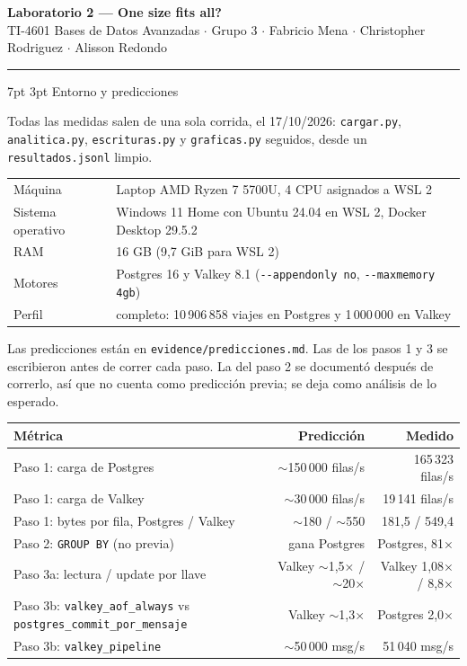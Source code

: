 \documentclass[10pt,letterpaper]{article}
\makeatletter
\renewcommand\section{\@startsection{section}{1}{\z@}%
  {7pt \@plus 2pt \@minus 1pt}{3pt}%
  {\normalfont\normalsize\bfseries\color{acc}}}
\makeatother
\begin{document}
{\LARGE\bfseries\color{acc} Laboratorio 2 --- One size fits all?}\\[2pt]
{\footnotesize\color{gris} TI-4601 Bases de Datos Avanzadas $\cdot$ Grupo 3 $\cdot$ Fabricio Mena $\cdot$ Christopher Rodriguez $\cdot$ Alisson Redondo}

\vspace{4pt}\hrule\vspace{6pt}

\section{Entorno y predicciones}

Todas las medidas salen de una sola corrida, el 17/10/2026: \texttt{cargar.py}, \texttt{analitica.py},
\texttt{escrituras.py} y \texttt{graficas.py} seguidos, desde un \texttt{resultados.jsonl} limpio.

\begin{center}\footnotesize
\begin{tabular}{@{}ll@{}}
\toprule
Máquina & Laptop AMD Ryzen 7 5700U, 4 CPU asignados a WSL 2 \\
Sistema operativo & Windows 11 Home con Ubuntu 24.04 en WSL 2, Docker Desktop 29.5.2 \\
RAM & 16 GB (9,7 GiB para WSL 2) \\
Motores & Postgres 16 y Valkey 8.1 (\texttt{-{}-appendonly no}, \texttt{-{}-maxmemory 4gb}) \\
Perfil & completo: 10\,906\,858 viajes en Postgres y 1\,000\,000 en Valkey \\
\bottomrule
\end{tabular}
\end{center}

Las predicciones están en \texttt{evidence/predicciones.md}. Las de los pasos 1 y 3 se escribieron antes
de correr cada paso. La del paso 2 se documentó después de correrlo, así que no cuenta como predicción
previa; se deja como análisis de lo esperado.

\begin{center}\footnotesize
\begin{tabular}{@{}lrr@{}}
\toprule
\textbf{Métrica} & \textbf{Predicción} & \textbf{Medido} \\
\midrule
Paso 1: carga de Postgres & $\sim$150\,000 filas/s & 165\,323 filas/s \\
Paso 1: carga de Valkey & $\sim$30\,000 filas/s & 19\,141 filas/s \\
Paso 1: bytes por fila, Postgres / Valkey & $\sim$180 / $\sim$550 & 181,5 / 549,4 \\
Paso 2: \texttt{GROUP BY} (no previa) & gana Postgres & Postgres, 81× \\
Paso 3a: lectura / update por llave & Valkey $\sim$1,5× / $\sim$20× & Valkey 1,08× / 8,8× \\
Paso 3b: \texttt{valkey\_aof\_always} vs \texttt{postgres\_commit\_por\_mensaje} & Valkey $\sim$1,3× & Postgres 2,0× \\
Paso 3b: \texttt{valkey\_pipeline} & $\sim$50\,000 msg/s & 51\,040 msg/s \\
\bottomrule
\end{tabular}
\end{center}
\end{document}
